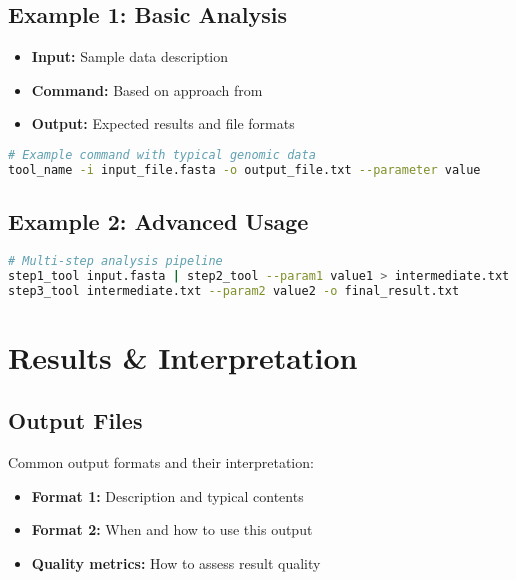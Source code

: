 \documentclass[a4paper,11pt]{article}
\begin{document}
\subsection{Example 1: Basic Analysis}

\begin{itemize}
    \item \textbf{Input:} Sample data description
    \item \textbf{Command:} Based on approach from \cite{example2024}
    \item \textbf{Output:} Expected results and file formats
\end{itemize}

\begin{lstlisting}[language=bash, caption=Basic command example]
# Example command with typical genomic data
tool_name -i input_file.fasta -o output_file.txt --parameter value
\end{lstlisting}

\subsection{Example 2: Advanced Usage}

\begin{lstlisting}[language=bash, caption=Advanced analysis pipeline]
# Multi-step analysis pipeline
step1_tool input.fasta | step2_tool --param1 value1 > intermediate.txt
step3_tool intermediate.txt --param2 value2 -o final_result.txt
\end{lstlisting}

\section{Results \& Interpretation}

\subsection{Output Files}

Common output formats and their interpretation:
\begin{itemize}
    \item \textbf{Format 1:} Description and typical contents
    \item \textbf{Format 2:} When and how to use this output
    \item \textbf{Quality metrics:} How to assess result quality
\end{itemize}
\end{document}

